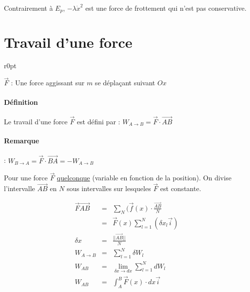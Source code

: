 	Contrairement à $E_p$, $-\lambda \dot{x}^2$ est une force de frottement qui n'est pas conservative.

\section{Travail d'une force}

\begin{wrapfigure}[6]{r}{0pt}
\end{wrapfigure}

$\vec{F}$ : Une force aggissant sur $m$ se déplaçant suivant $Ox$

\paragraph{Définition} Le travail d'une force $\vec{F}$ est défini par : $W_{A \rightarrow B} = \vec{F}\cdot\overrightarrow{AB}$
\paragraph{Remarque} : $W_{B \rightarrow A} = \vec{F}\cdot\overrightarrow{BA} = -W_{A \rightarrow B} $

Pour une force $\vec{F}$ \ul{quelconque} (variable en fonction de la position). On divise l'intervalle $\vec{AB}$ en $N$ sous intervalles sur lesqueles $\vec{F}$ est constante.

\[
	\begin{array}{rcl}
		\vec{F}\overrightarrow{AB} &=& \sum_N(\vec{f}(x) \cdot \frac{\overrightarrow{AB}}{N} \\
								   &=& \vec{F}(x) \sum_{l=1}^{N}(\delta x_l \vec{i}) \\
		\delta x &=& \frac{||\overrightarrow{AB}||}{N} \\
		W_{A \rightarrow B} &=& \sum_{l=1}^N \delta W_l \\
		W_{AB} &=& \lim_{\delta x \to dx} \sum_{l=1}^N dW_l \\
		W_{AB} &=& \int_A^B \vec{F}(x)\cdot dx\vec{i}
\end{array}\]

